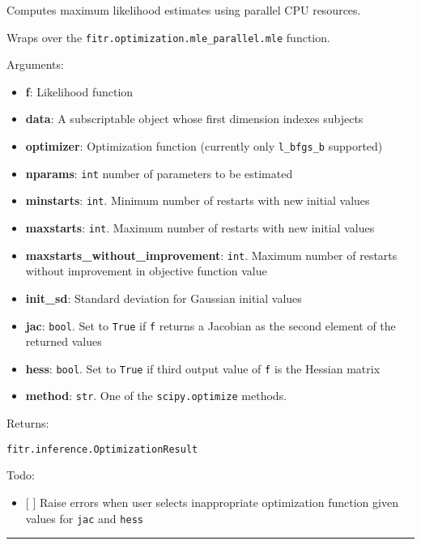 Computes maximum likelihood estimates using parallel CPU resources.

Wraps over the \texttt{fitr.optimization.mle\_parallel.mle} function.

Arguments:

\begin{itemize}
\tightlist
\item
  \textbf{f}: Likelihood function
\item
  \textbf{data}: A subscriptable object whose first dimension indexes
  subjects
\item
  \textbf{optimizer}: Optimization function (currently only
  \texttt{l\_bfgs\_b} supported)
\item
  \textbf{nparams}: \texttt{int} number of parameters to be estimated
\item
  \textbf{minstarts}: \texttt{int}. Minimum number of restarts with new
  initial values
\item
  \textbf{maxstarts}: \texttt{int}. Maximum number of restarts with new
  initial values
\item
  \textbf{maxstarts\_without\_improvement}: \texttt{int}. Maximum number
  of restarts without improvement in objective function value
\item
  \textbf{init\_sd}: Standard deviation for Gaussian initial values
\item
  \textbf{jac}: \texttt{bool}. Set to \texttt{True} if \texttt{f}
  returns a Jacobian as the second element of the returned values
\item
  \textbf{hess}: \texttt{bool}. Set to \texttt{True} if third output
  value of \texttt{f} is the Hessian matrix
\item
  \textbf{method}: \texttt{str}. One of the \texttt{scipy.optimize}
  methods.
\end{itemize}

Returns:

\texttt{fitr.inference.OptimizationResult}

Todo:

\begin{itemize}
\tightlist
\item
  {[} {]} Raise errors when user selects inappropriate optimization
  function given values for \texttt{jac} and \texttt{hess}
\end{itemize}

\begin{center}\rule{0.5\linewidth}{\linethickness}\end{center}

